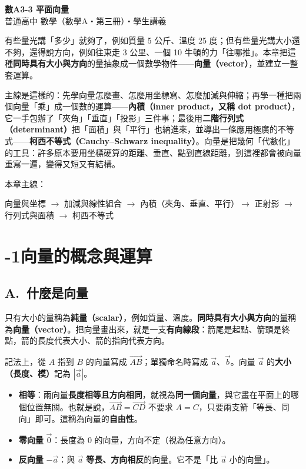 \documentclass[11pt]{article}
\begin{document}
\begin{center}
{\sffamily\Huge\bfseries 數A3-3 平面向量}\\[3pt]
{\sffamily\large 普通高中 數學（數學A・第三冊）・學生講義}
\end{center}
\vspace{0.6em}

有些量光講「多少」就夠了，例如質量 5 公斤、溫度 25 度；但有些量光講大小還不夠，還得說方向，例如往東走 3 公里、一個 10 牛頓的力「往哪推」。本章把這種\textbf{同時具有大小與方向}的量抽象成一個數學物件——\textbf{向量（vector）}，並建立一整套運算。

主線是這樣的：先學向量怎麼畫、怎麼用坐標寫、怎麼加減與伸縮；再學一種把兩個向量「乘」成一個數的運算——\textbf{內積（inner product，又稱 dot product）}，它一手包辦了「夾角」「垂直」「投影」三件事；最後用\textbf{二階行列式（determinant）}把「面積」與「平行」也納進來，並導出一條應用極廣的不等式——\textbf{柯西不等式（Cauchy–Schwarz inequality）}。向量是把幾何「代數化」的工具：許多原本要用坐標硬算的距離、垂直、點到直線距離，到這裡都會被向量重寫一遍，變得又短又有結構。

\medskip
本章主線：

\begin{center}
向量與坐標 $\rightarrow$ 加減與線性組合 $\rightarrow$ 內積（夾角、垂直、平行）$\rightarrow$ 正射影 $\rightarrow$ 行列式與面積 $\rightarrow$ 柯西不等式
\end{center}

\section*{-1\quad 向量的概念與運算}

\subsection*{\sffamily A.\ 什麼是向量}

只有大小的量稱為\textbf{純量（scalar）}，例如質量、溫度。\textbf{同時具有大小與方向}的量稱為\textbf{向量（vector）}。把向量畫出來，就是一支\textbf{有向線段}：箭尾是起點、箭頭是終點，箭的長度代表大小、箭的指向代表方向。

記法上，從 $A$ 指到 $B$ 的向量寫成 $\overrightarrow{AB}$；單獨命名時寫成 $\vec a$、$\vec b$。向量 $\vec a$ 的\textbf{大小（長度、模）}記為 $|\vec a|$。

\begin{itemize}\setlength{\itemsep}{1pt}
\item \textbf{相等}：兩向量\textbf{長度相等且方向相同}，就視為\textbf{同一個向量}，與它畫在平面上的哪個位置無關。也就是說，$\overrightarrow{AB}=\overrightarrow{CD}$ 不要求 $A=C$，只要兩支箭「等長、同向」即可。這稱為向量的\textbf{自由性}。
\item \textbf{零向量} $\vec 0$：長度為 $0$ 的向量，方向不定（視為任意方向）。
\item \textbf{反向量} $-\vec a$：與 $\vec a$ \textbf{等長、方向相反}的向量。它不是「比 $\vec a$ 小的向量」。
\end{itemize}
\end{document}
